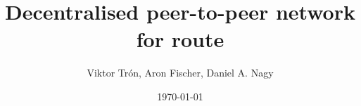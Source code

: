 \documentclass[a4paper,10pt]{article}
\title{Decentralised peer-to-peer network for route}
\author{Viktor Trón, Aron Fischer, Daniel A. Nagy}
\date{\today}
\begin{document}
\maketitle

\setcounter{tocdepth}{2}
\tableofcontents


\cite{ethersphere2016sw3}
\cite{ethersphere2016smash}
\cite{maymounkov2002kademlia}
\cite{heep2010r}
\cite{malavolta2017concurrency}
\cite{chiesa2017decentralized}
\cite{heilman2016tumblebit}
\cite{green2016bolt}
\cite{miller2017sprites}
\cite{mcdonald2017payment}
\cite{diferrante2017payment}


\printglossary
\end{document}
